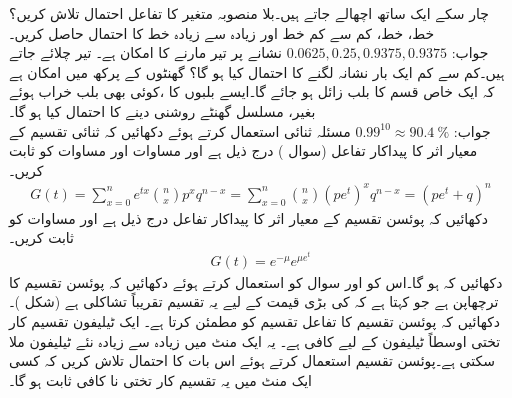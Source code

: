 \quad
چار سکے ایک ساتھ  اچھالے جاتے ہیں۔بلا منصوبہ متغیر  کا تفاعل احتمال تلاش کریں؟  خط،  خط، کم سے کم  خط اور زیادہ سے زیادہ   خط کا احتمال حاصل کریں۔\\
جواب:\quad
$0.0625, 0.25, 0.9375,0.9375$
\quad
نشانے پر تیر مارنے کا امکان  ہے۔  تیر چلائے جاتے ہیں۔کم سے کم ایک بار نشانہ لگنے کا احتمال کیا ہو گا؟
\quad
{} گھنٹوں کے پرکھ میں  امکان ہے کہ ایک خاص قسم کا بلب زائل ہو جائے گا۔ایسے  بلبوں کا ،کوئی بھی بلب خراب ہوئے بغیر، مسلسل  گھنٹے  روشنی دینے کا احتمال کیا ہو گا۔\\
جواب:\quad
$0.99^{10}\approx \SI{90.4}{\percent}$
\quad
مسئلہ ثنائی استعمال کرتے ہوئے دکھائیں کہ ثنائی تقسیم کے  معیار اثر کا پیداکار تفاعل (سوال ) درج ذیل ہے اور مساوات  اور مساوات  کو ثابت کریں۔
\begin{align*}
G(t)=\sum_{x=0}^{n}e^{tx}\binom{n}{x}p^xq^{n-x}=\sum_{x=0}^{n}\binom{n}{x}(pe^t)^xq^{n-x}=(pe^t+q)^n
\end{align*}  
\quad
دکھائیں کہ پوئسن تقسیم کے  معیار اثر کا پیداکار تفاعل  درج ذیل ہے اور مساوات  کو ثابت کریں۔
\begin{align*}
G(t)=e^{-\mu}e^{\mu e^t}
\end{align*}  
\quad
دکھائیں کہ  ہو گا۔اس کو اور سوال  کو استعمال کرتے ہوئے  دکھائیں کہ پوئسن تقسیم کا ترچھاپن  ہے جو کہتا ہے کہ  کی بڑی قیمت کے لیے یہ تقسیم تقریباً تشاکلی ہے (شکل )۔
\quad
دکھائیں کہ پوئسن تقسیم کا تفاعل تقسیم  کو مطمئن کرتا ہے۔
\quad
ایک ٹیلیفون تقسیم کار تختی اوسطاً  ٹیلیفون کے لیے کافی ہے۔ یہ ایک منٹ میں زیادہ سے زیادہ  نئے ٹیلیفون ملا سکتی ہے۔پوئسن تقسیم استعمال کرتے ہوئے اس بات کا احتمال تلاش کریں کہ کسی ایک منٹ میں یہ تقسیم کار تختی نا کافی ثابت ہو گا۔
